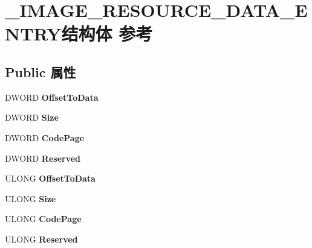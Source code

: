 \hypertarget{struct___i_m_a_g_e___r_e_s_o_u_r_c_e___d_a_t_a___e_n_t_r_y}{}\section{\+\_\+\+I\+M\+A\+G\+E\+\_\+\+R\+E\+S\+O\+U\+R\+C\+E\+\_\+\+D\+A\+T\+A\+\_\+\+E\+N\+T\+R\+Y结构体 参考}
\label{struct___i_m_a_g_e___r_e_s_o_u_r_c_e___d_a_t_a___e_n_t_r_y}
\subsection*{Public 属性}
\begin{DoxyCompactItemize}
\item 
\mbox{\label{struct___i_m_a_g_e___r_e_s_o_u_r_c_e___d_a_t_a___e_n_t_r_y_a7f75a04ab8cc18cd5a2c665e5d8811e8}} 
D\+W\+O\+RD {\bfseries Offset\+To\+Data}
\item 
\mbox{\label{struct___i_m_a_g_e___r_e_s_o_u_r_c_e___d_a_t_a___e_n_t_r_y_a94b5557407ff656b3f85258ff1b74f2f}} 
D\+W\+O\+RD {\bfseries Size}
\item 
\mbox{\label{struct___i_m_a_g_e___r_e_s_o_u_r_c_e___d_a_t_a___e_n_t_r_y_a1347f62f04efb56e465cbb0d4a318916}} 
D\+W\+O\+RD {\bfseries Code\+Page}
\item 
\mbox{\label{struct___i_m_a_g_e___r_e_s_o_u_r_c_e___d_a_t_a___e_n_t_r_y_a0f644fc7076aff38d3b70f759be48748}} 
D\+W\+O\+RD {\bfseries Reserved}
\item 
\mbox{\label{struct___i_m_a_g_e___r_e_s_o_u_r_c_e___d_a_t_a___e_n_t_r_y_adef3a2e148f5754ecf40b00b68559ed7}} 
U\+L\+O\+NG {\bfseries Offset\+To\+Data}
\item 
\mbox{\label{struct___i_m_a_g_e___r_e_s_o_u_r_c_e___d_a_t_a___e_n_t_r_y_a2c28aa3d6f172be80bd3b49191769398}} 
U\+L\+O\+NG {\bfseries Size}
\item 
\mbox{\label{struct___i_m_a_g_e___r_e_s_o_u_r_c_e___d_a_t_a___e_n_t_r_y_ac8fe8723baf1258f1253bc570f7836ac}} 
U\+L\+O\+NG {\bfseries Code\+Page}
\item 
\mbox{\label{struct___i_m_a_g_e___r_e_s_o_u_r_c_e___d_a_t_a___e_n_t_r_y_a0be82548eee0c55742264c32ee12466c}} 
U\+L\+O\+NG {\bfseries Reserved}
\end{DoxyCompactItemize}


